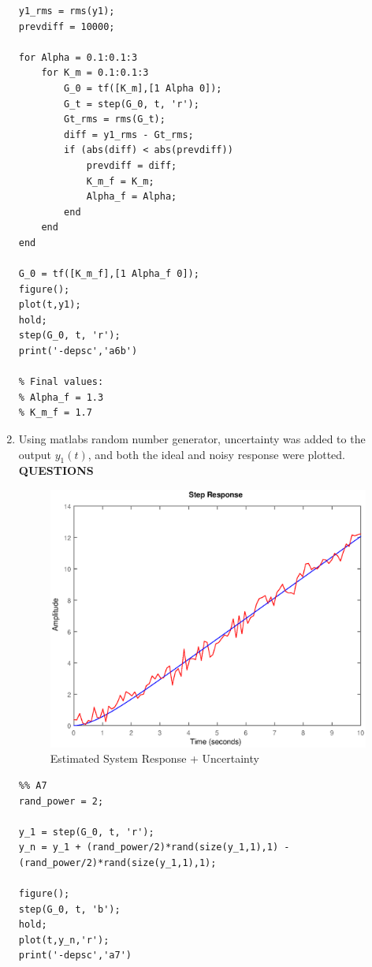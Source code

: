 \documentclass[11pt,a4paper]{article}
\begin{document}
\begin{enumerate}
\begin{lstlisting}
y1_rms = rms(y1);
prevdiff = 10000;

for Alpha = 0.1:0.1:3
    for K_m = 0.1:0.1:3
        G_0 = tf([K_m],[1 Alpha 0]);
        G_t = step(G_0, t, 'r');
        Gt_rms = rms(G_t);
        diff = y1_rms - Gt_rms;
        if (abs(diff) < abs(prevdiff))
            prevdiff = diff;
            K_m_f = K_m;
            Alpha_f = Alpha;
        end
    end
end

G_0 = tf([K_m_f],[1 Alpha_f 0]);
figure();
plot(t,y1);
hold;
step(G_0, t, 'r');
print('-depsc','a6b')

% Final values:
% Alpha_f = 1.3
% K_m_f = 1.7
    \end{lstlisting}
    
    
    
    
    
    
    \pagebreak
    \item Using matlabs random number generator, uncertainty was added to the output $y_1(t)$, and both the ideal and noisy response were plotted. \textbf{QUESTIONS}
    \begin{figure}[H]
	\centering
	\includegraphics[width=.8\textwidth]{PreLach/a7.eps}
	\caption{\label{fig:rand}Estimated System Response + Uncertainty}
	\end{figure}
    \begin{lstlisting}
%% A7
rand_power = 2;

y_1 = step(G_0, t, 'r');
y_n = y_1 + (rand_power/2)*rand(size(y_1,1),1) - (rand_power/2)*rand(size(y_1,1),1);

figure();
step(G_0, t, 'b');
hold;
plot(t,y_n,'r');
print('-depsc','a7')

	\end{lstlisting}
    
\end{enumerate}
\end{document}
